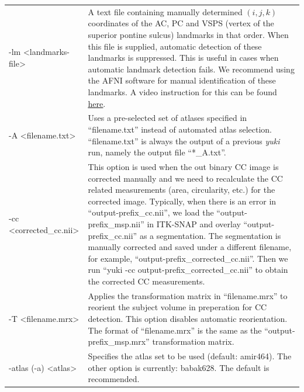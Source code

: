 \documentclass[11pt]{article}
\newcommand{\TG}{\textgreater}
\newcommand{\TL}{\textless}
\begin{document}
\begin{longtable}{p{}p{}}
-lm \TL landmarks-file\TG &
A text file containing manually determined $(i, j, k)$ coordinates
of the AC, PC and VSPS (vertex of the superior pontine sulcus) landmarks in that order. 
When this file is supplied,
automatic detection of these landmarks is suppressed. This is useful
in cases when automatic landmark detection fails.
We recommend using the AFNI software for manual identification of these landmarks.
A video instruction for this can be found
\href{https://www.youtube.com/watch?v=q5GBaNnjOa8}{\underline{here}}.
\\

-A \TL filename.txt\TG & Uses a pre-selected set of atlases specified in 
``filename.txt'' instead of automated atlas selection. 
``filename.txt'' is always the output of a previous {\it yuki} run, namely
the output file
``*\_A.txt''. \\ 

-cc \TL corrected\_cc.nii\TG & This option is used when the out binary CC 
image is corrected manually and we need to recalculate the CC related measurements 
(area, circularity, etc.) for the corrected image.  Typically, when there is an error
in ``output-prefix\_cc.nii'', we load the
``output-prefix\_msp.nii'' in ITK-SNAP and overlay
``output-prefix\_cc.nii'' as a segmentation.  The segmentation
is manually corrected and saved under a different filename, for example,
``output-prefix\_corrected\_cc.nii''.  Then we run 
``yuki -cc output-prefix\_corrected\_cc.nii'' to obtain the corrected CC measurements.
\\ 

-T \TL filename.mrx\TG & Applies the transformation matrix in 
``filename.mrx'' to reorient the subject volume in preperation for CC detection. 
This option disables automatic reorientation. The format of ``filename.mrx'' is 
the same as the ``output-prefix\_msp.mrx'' transformation matrix.\\

-atlas (-a) \TL atlas\TG & Specifies the atlas set to be used (default: amir464).  The
other option is currently: babak628.  The default is recommended. \\
\end{longtable}
\end{document}
